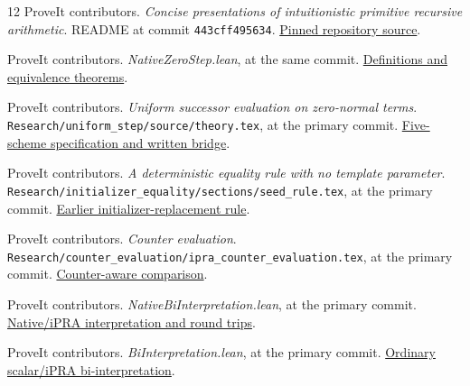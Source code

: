 \documentclass[11pt,letterpaper]{article}
\newcommand{\file}[1]{\nolinkurl{#1}}
\begin{document}
\begin{thebibliography}{12}
\small
{} ProveIt contributors.
\emph{Concise presentations of intuitionistic primitive recursive arithmetic}.
README at commit \texttt{443cff495634}.
\href{https://github.com/VladimirReshetnikov/ProveIt/blob/443cff49563457a48ee0f663012d56c4bdb58fa0/Logic/PrimitiveRecursiveArithmetic/ConciseIPRA/README.md}{Pinned repository source}.

 ProveIt contributors.
\emph{NativeZeroStep.lean}, at the same commit.
\href{https://github.com/VladimirReshetnikov/ProveIt/blob/443cff49563457a48ee0f663012d56c4bdb58fa0/Logic/PrimitiveRecursiveArithmetic/ConciseIPRA/Lean/ConciseIPRA/NativeZeroStep.lean}{Definitions and equivalence theorems}.

 ProveIt contributors.
\emph{Uniform successor evaluation on zero-normal terms}.
\file{Research/uniform_step/source/theory.tex}, at the primary commit.
\href{https://github.com/VladimirReshetnikov/ProveIt/blob/443cff49563457a48ee0f663012d56c4bdb58fa0/Logic/PrimitiveRecursiveArithmetic/ConciseIPRA/Research/uniform_step/source/theory.tex}{Five-scheme specification and written bridge}.

 ProveIt contributors.
\emph{A deterministic equality rule with no template parameter}.
\file{Research/initializer_equality/sections/seed_rule.tex}, at the primary commit.
\href{https://github.com/VladimirReshetnikov/ProveIt/blob/443cff49563457a48ee0f663012d56c4bdb58fa0/Logic/PrimitiveRecursiveArithmetic/ConciseIPRA/Research/initializer_equality/sections/seed_rule.tex}{Earlier initializer-replacement rule}.

 ProveIt contributors.
\emph{Counter evaluation}.
\file{Research/counter_evaluation/ipra_counter_evaluation.tex}, at the primary commit.
\href{https://github.com/VladimirReshetnikov/ProveIt/blob/443cff49563457a48ee0f663012d56c4bdb58fa0/Logic/PrimitiveRecursiveArithmetic/ConciseIPRA/Research/counter_evaluation/ipra_counter_evaluation.tex}{Counter-aware comparison}.

 ProveIt contributors.
\emph{NativeBiInterpretation.lean}, at the primary commit.
\href{https://github.com/VladimirReshetnikov/ProveIt/blob/443cff49563457a48ee0f663012d56c4bdb58fa0/Logic/PrimitiveRecursiveArithmetic/ConciseIPRA/Lean/ConciseIPRA/NativeBiInterpretation.lean}{Native/iPRA interpretation and round trips}.

 ProveIt contributors.
\emph{BiInterpretation.lean}, at the primary commit.
\href{https://github.com/VladimirReshetnikov/ProveIt/blob/443cff49563457a48ee0f663012d56c4bdb58fa0/Logic/PrimitiveRecursiveArithmetic/ConciseIPRA/Lean/ConciseIPRA/BiInterpretation.lean}{Ordinary scalar/iPRA bi-interpretation}.


\end{thebibliography}
\end{document}
